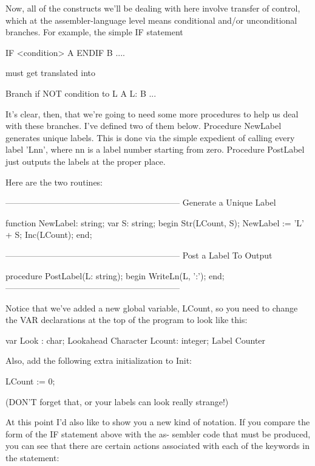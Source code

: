 \documentclass[float=false, crop=false]{standalone}
\begin{document}
Now, all of the constructs we'll be dealing with here involve transfer of
control, which at the assembler-language level means conditional and/or
unconditional branches. For example, the simple IF statement


          IF <condition> A ENDIF B ....

must get translated into

          Branch if NOT condition to L
          A
     L:   B
          ...


It's clear, then, that we're going to need some more procedures to help us deal
with these branches. I've defined two of them below. Procedure NewLabel
generates unique labels. This is done via the simple expedient of calling every
label 'Lnn', where nn is a label number starting from zero. Procedure PostLabel
just outputs the labels at the proper place.

Here are the two routines:

\begin{code}
{--------------------------------------------------------------}
{ Generate a Unique Label }

function NewLabel: string;
var S: string;
begin
   Str(LCount, S);
   NewLabel := 'L' + S;
   Inc(LCount);
end;


{--------------------------------------------------------------}
{ Post a Label To Output }

procedure PostLabel(L: string);
begin
   WriteLn(L, ':');
end;
{--------------------------------------------------------------}
\end{code}

Notice that we've added a new global variable, LCount, so you need to change the
VAR declarations at the top of the program to look like this:

\begin{code}
var Look  : char;              { Lookahead Character }
    Lcount: integer;           { Label Counter }
\end{code}

Also, add the following extra initialization to Init:


   LCount := 0;

(DON'T forget that, or your labels can look really strange!)

At this point I'd also like to show you a new kind of notation. If you compare
the form of the IF statement above with the as- sembler code that must be
produced, you can see that there are certain actions associated with each of the
keywords in the statement:
\end{document}
